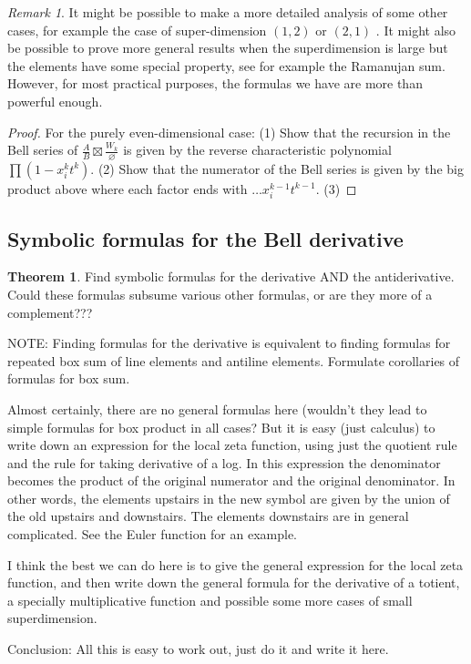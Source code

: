 \documentclass[a4paper]{article}
\theoremstyle{definition}
\newtheorem{theorem}{Theorem}[section]
\theoremstyle{remark}
\newtheorem*{remark}{Remark}
\begin{document}
\begin{remark}
It might be possible to make a more detailed analysis of some other cases, for example the case of super-dimension $(1, 2)$ or $(2, 1)$ . It might also be possible to prove more general results when the superdimension is large but the elements have some special property, see for example the Ramanujan sum. However, for most practical purposes, the formulas we have are more than powerful enough.
\end{remark}


\begin{proof}
For the purely even-dimensional case: (1) Show that the recursion in the Bell series of $\frac{A}{B} \boxtimes \frac{W_k}{\varnothing}$ is given by the reverse characteristic polynomial $\prod (1-x_i^k t^k)$. (2) Show that the numerator of the Bell series is given by the big product above where each factor ends with $\ldots x_i^{k-1} t^{k-1}$. (3) 
\end{proof}



\subsection{Symbolic formulas for the Bell derivative}

\begin{theorem}
Find symbolic formulas for the derivative AND the antiderivative. Could these formulas subsume various other formulas, or are they more of a complement???

NOTE: Finding formulas for the derivative is equivalent to finding formulas for repeated box sum of line elements and antiline elements. Formulate corollaries of formulas for box sum.
 
Almost certainly, there are no general formulas here (wouldn't they lead to simple formulas for box product in all cases? But it is easy (just calculus) to write down an expression for the local zeta function, using just the quotient rule and the rule for taking derivative of a log. In this expression the denominator becomes the product of the original numerator and the original denominator. In other words, the elements upstairs in the new symbol are given by the union of the old upstairs and downstairs. The elements downstairs are in general complicated. See the Euler function for an example.

I think the best we can do here is to give the general expression for the local zeta function, and then write down the general formula for the derivative of a totient, a specially multiplicative function and possible some more cases of small superdimension.

Conclusion: All this is easy to work out, just do it and write it here.
\end{theorem}
\end{document}

